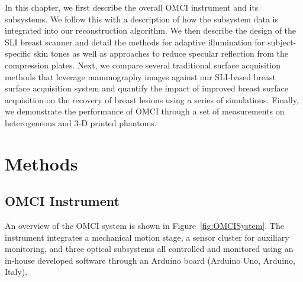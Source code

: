 In this chapter, we first describe the overall OMCI instrument and its subsystems. We follow this with a description of how the subsystem data is integrated into our reconstruction algorithm. We then describe the design of the SLI breast scanner and detail the methods for adaptive illumination for subject-specific skin tones as well as approaches to reduce specular reflection from the compression plates. Next, we compare several traditional surface acquisition methods that leverage mammography images against our SLI-based breast surface acquisition system and quantify the impact of improved breast surface acquisition on the recovery of breast lesions using a series of simulations. Finally, we demonstrate the performance of OMCI through a set of measurements on heterogeneous and 3-D printed phantoms.



\section{Methods}
\label{chap:omci:methods}

\subsection{OMCI Instrument}
An overview of the OMCI system is shown in Figure~\ref{fig:OMCISystem}. The instrument integrates a mechanical motion stage, a sensor cluster for auxiliary monitoring, and three optical subsystems all controlled and monitored using an in-house developed software through an Arduino board (Arduino Uno, Arduino, Italy). 

